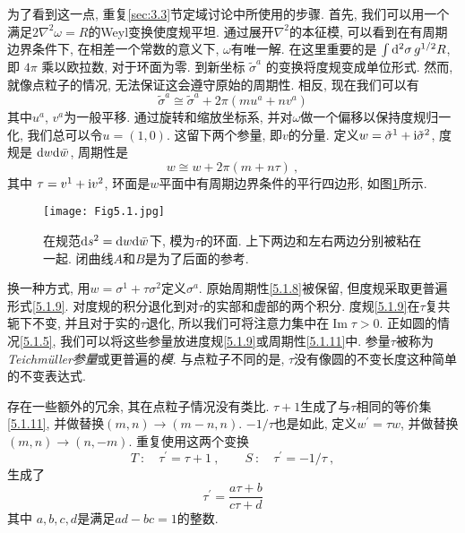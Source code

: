 为了看到这一点, 重复\ref{sec:3.3}节定域讨论中所使用的步骤. 首先, 我们可以用一个满足$2 \nabla^{2} \omega=R $的Weyl变换使度规平坦. 
通过展开$\nabla^{2}$的本征模, 可以看到在有周期边界条件下, 在相差一个常数的意义下, $\omega$有唯一解. 在这里重要的是 $\int \mathrm{d}^{2} \sigma \,g^{1 / 2} R$, 即 $4 \pi$ 乘以欧拉数, 对于环面为零. 到新坐标 $\tilde{\sigma}^{a}$ 的变换将度规变成单位形式. 然而, 就像点粒子的情况, 无法保证这会遵守原始的周期性. 相反, 现在我们可以有
\begin{equation}
	\tilde{\sigma}^{a} \cong \tilde{\sigma}^{a}+2 \pi(m u^{a}+n v^{a}) \label{5.1.10}
\end{equation}
其中$u^{a}$, $v^{a} $为一般平移. 通过旋转和缩放坐标系, 并对$\omega$做一个偏移以保持度规归一化, 我们总可以令$u=(1,0)$. 这留下两个参量, 即$v$的分量. 
定义$w=\tilde{\sigma}^{1}+\mathrm{i} \tilde{\sigma}^{2}$, 度规是 $\mathrm{d} w \mathrm{d} \bar{w}$, 周期性是
\begin{equation}
	w \cong w+2 \pi(m+n \tau) \:, \label{5.1.11}
\end{equation}
其中 $\tau=v^{1}+\mathrm{i} v^{2} $, 环面是$w$平面中有周期边界条件的平行四边形, 如图\ref{fig:5.1}所示.
\begin{figure}[h]
	\begin{center}
		\texttt{[image: Fig5.1.jpg]}\\
		\caption{在规范$\mathrm{d} s^{2}=\mathrm{d} w \mathrm{d} \bar{w}$下, 模为$\tau$的环面. 上下两边和左右两边分别被粘在一起. 闭曲线$A$和$B$是为了后面的参考.}\label{fig:5.1}
	\end{center}
\end{figure}


换一种方式, 用$w=\sigma^{1}+\tau \sigma^{2}$定义$\sigma^{a}$. 原始周期性\eqref{5.1.8}被保留, 但度规采取更普遍形式\eqref{5.1.9}. 
对度规的积分退化到对$\tau$的实部和虚部的两个积分. 度规\eqref{5.1.9}在$\tau$复共轭下不变, 并且对于实的$\tau$退化, 
所以我们可将注意力集中在$\operatorname{Im} \tau>0$. 正如圆的情况\eqref{5.1.5}, 我们可以将这些参量放进度规\eqref{5.1.9}或周期性\eqref{5.1.11}中.
参量$\tau$被称为\emph{Teichm\"{u}ller参量}或更普遍的\emph{模}. 与点粒子不同的是, $\tau$没有像圆的不变长度这种简单的不变表达式.

存在一些额外的冗余, 其在点粒子情况没有类比. $\tau+1$生成了与$\tau$相同的等价集\eqref{5.1.11}, 并做替换$(m, n)\to(m-n, n) $. 
$-1 / \tau$也是如此, 定义$w^{\prime}=\tau w$, 并做替换$(m, n) \rightarrow(n,-m)$. 重复使用这两个变换
\begin{equation}
	T\:: \quad \tau^{\prime}=\tau+1\:, \qquad S\: : \quad \tau^{\prime}=-1 / \tau \:, \label{5.1.12}
\end{equation}
生成了
\begin{equation}
	\tau^{\prime}=\frac{a \tau+b}{c \tau+d} \label{5.1.13}
\end{equation}
其中 $a, b, c, d$是满足$a d-b c=1$的整数.

